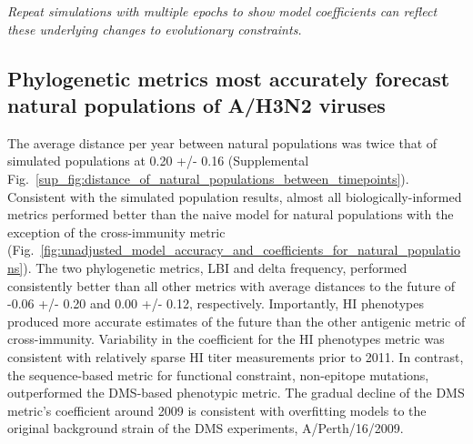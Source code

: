 \textit{Repeat simulations with multiple epochs to show model coefficients can reflect these underlying changes to evolutionary constraints.}

\subsection*{Phylogenetic metrics most accurately forecast natural populations of A/H3N2 viruses}

The average distance per year between natural populations was twice that of simulated populations at 0.20 +/- 0.16 (Supplemental Fig.~\ref{sup_fig:distance_of_natural_populations_between_timepoints}).
Consistent with the simulated population results, almost all biologically-informed metrics performed better than the naive model for natural populations with the exception of the cross-immunity metric (Fig.~\ref{fig:unadjusted_model_accuracy_and_coefficients_for_natural_populations}).
The two phylogenetic metrics, LBI and delta frequency, performed consistently better than all other metrics with average distances to the future of -0.06 +/- 0.20 and 0.00 +/- 0.12, respectively.
Importantly, HI phenotypes produced more accurate estimates of the future than the other antigenic metric of cross-immunity.
Variability in the coefficient for the HI phenotypes metric was consistent with relatively sparse HI titer measurements prior to 2011.
In contrast, the sequence-based metric for functional constraint, non-epitope mutations, outperformed the DMS-based phenotypic metric.
The gradual decline of the DMS metric's coefficient around 2009 is consistent with overfitting models to the original background strain of the DMS experiments, A/Perth/16/2009.

